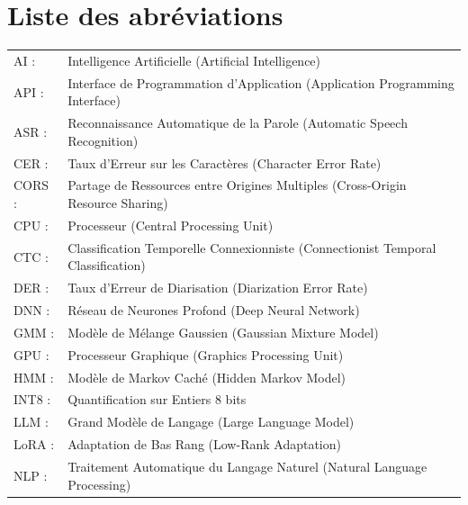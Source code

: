 \documentclass[12pt]{report}
\newcommand{\hlinecolor}{\arrayrulecolor{myColor}\hline\arrayrulecolor{black}}
\begin{document}
\section*{Liste des abréviations}
 \setcounter{page}{4}
\begin{tabular}{p{} p{}}  \hlinecolor
\raggedright \textcolor{myColor}{AI :} & Intelligence Artificielle (Artificial Intelligence) \\
\raggedright \textcolor{myColor}{API :} & Interface de Programmation d'Application (Application Programming Interface) \\
\raggedright \textcolor{myColor}{ASR :} & Reconnaissance Automatique de la Parole (Automatic Speech Recognition) \\
\raggedright \textcolor{myColor}{CER :} & Taux d'Erreur sur les Caractères (Character Error Rate) \\
\raggedright \textcolor{myColor}{CORS :} & Partage de Ressources entre Origines Multiples (Cross-Origin Resource Sharing) \\
\raggedright \textcolor{myColor}{CPU :} & Processeur (Central Processing Unit) \\
\raggedright \textcolor{myColor}{CTC :} & Classification Temporelle Connexionniste (Connectionist Temporal Classification) \\
\raggedright \textcolor{myColor}{DER :} & Taux d'Erreur de Diarisation (Diarization Error Rate) \\
\raggedright \textcolor{myColor}{DNN :} & Réseau de Neurones Profond (Deep Neural Network) \\
\raggedright \textcolor{myColor}{GMM :} & Modèle de Mélange Gaussien (Gaussian Mixture Model) \\
\raggedright \textcolor{myColor}{GPU :} & Processeur Graphique (Graphics Processing Unit) \\
\raggedright \textcolor{myColor}{HMM :} & Modèle de Markov Caché (Hidden Markov Model) \\
\raggedright \textcolor{myColor}{INT8 :} & Quantification sur Entiers 8 bits \\
\raggedright \textcolor{myColor}{LLM :} & Grand Modèle de Langage (Large Language Model) \\
\raggedright \textcolor{myColor}{LoRA :} & Adaptation de Bas Rang (Low-Rank Adaptation) \\
\raggedright \textcolor{myColor}{NLP :} & Traitement Automatique du Langage Naturel (Natural Language Processing) \\

\end{tabular}
\end{document}
